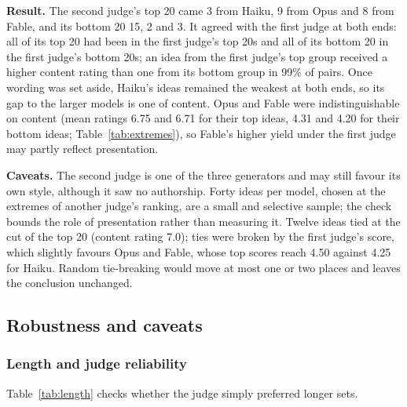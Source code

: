 \textbf{Result.} The second judge's top 20 came 3 from Haiku, 9 from Opus and 8 from Fable, and its bottom 20 15, 2 and 3. It agreed with the first judge at both ends: all of its top 20 had been in the first judge's top 20s and all of its bottom 20 in the first judge's bottom 20s; an idea from the first judge's top group received a higher content rating than one from its bottom group in 99\% of pairs. Once wording was set aside, Haiku's ideas remained the weakest at both ends, so its gap to the larger models is one of content. Opus and Fable were indistinguishable on content (mean ratings 6.75 and 6.71 for their top ideas, 4.31 and 4.20 for their bottom ideas; Table~\ref{tab:extremes}), so Fable's higher yield under the first judge may partly reflect presentation.

\textbf{Caveats.} The second judge is one of the three generators and may still favour its own style, although it saw no authorship. Forty ideas per model, chosen at the extremes of another judge's ranking, are a small and selective sample; the check bounds the role of presentation rather than measuring it. Twelve ideas tied at the cut of the top 20 (content rating 7.0); ties were broken by the first judge's score, which slightly favours Opus and Fable, whose top scores reach 4.50 against 4.25 for Haiku. Random tie-breaking would move at most one or two places and leaves the conclusion unchanged.

\hypertarget{robustness-and-caveats}{%
\subsection{Robustness and caveats}\label{robustness-and-caveats}}
\hypertarget{length-and-judge-reliability}{%
\subsubsection{Length and judge reliability}\label{length-and-judge-reliability}}

Table~\ref{tab:length} checks whether the judge simply preferred longer sets.

